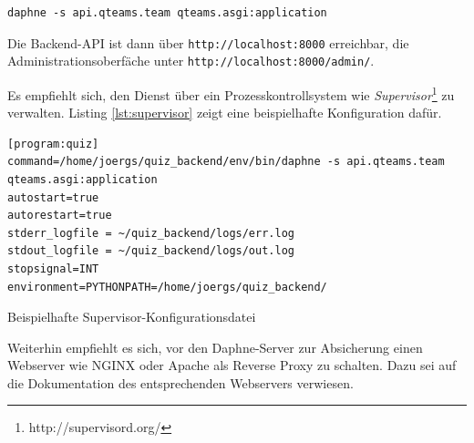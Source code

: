 \documentclass[a4paper,11pt,listof=numbered,glossary=totoc,parskip=half,toc=bib]{scrreprt}
\begin{document}
\begin{appendices}
	\begin{verbatim}
daphne -s api.qteams.team qteams.asgi:application
	\end{verbatim}
	
	Die Backend-API ist dann über \texttt{http://localhost:8000} erreichbar, die Administrationsoberfäche unter \texttt{http://localhost:8000/admin/}.
	
	Es empfiehlt sich, den Dienst über ein Prozesskontrollsystem wie \textit{Supervisor}\footnote{http://supervisord.org/} zu verwalten. Listing \ref{lst:supervisor} zeigt eine beispielhafte Konfiguration dafür.
	
	\begin{listing}
		\begin{verbatim}
[program:quiz]
command=/home/joergs/quiz_backend/env/bin/daphne -s api.qteams.team qteams.asgi:application
autostart=true
autorestart=true
stderr_logfile = ~/quiz_backend/logs/err.log
stdout_logfile = ~/quiz_backend/logs/out.log
stopsignal=INT
environment=PYTHONPATH=/home/joergs/quiz_backend/
		\end{verbatim}
		\caption{Beispielhafte Supervisor-Konfigurationsdatei}
		\label{lst:supervisor}
	\end{listing}
	
	Weiterhin empfiehlt es sich, vor den Daphne-Server zur Absicherung einen Webserver wie NGINX oder Apache als Reverse Proxy zu schalten. Dazu sei auf die Dokumentation des entsprechenden Webservers verwiesen.
	

	
	\end{appendices}
	\newpage	
	\setcounter{chapter}{\thelastRomanCounter} %
\renewcommand \thechapter{\Roman{chapter}}	\printbibliography[heading=bibnumbered,title=Literaturverzeichnis]
\end{document}
